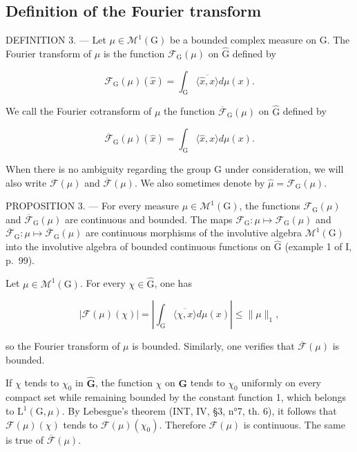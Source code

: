 \subsection{Definition of the Fourier transform}

DEFINITION 3. --- Let \(\mu \in \mathcal{M}^{1}(\mathrm{G})\) be a bounded complex measure on G. The Fourier transform of \(\mu\) is the function \(\mathcal{F}_{\mathrm{G}}(\mu)\) on \(\widehat{\mathrm{G}}\) defined by

\[
\mathcal {F} _ {\mathrm{G}} (\mu) (\widehat {x}) = \int_ {\mathrm{G}} \overline {{\langle \widehat {x} , x \rangle}} d \mu (x).\tag{5}
\]

We call the Fourier cotransform of \(\mu\) the function \(\overline{\mathcal{F}}_{\mathrm{G}}(\mu)\) on \(\widehat{\mathrm{G}}\) defined by

\[
\overline {{\mathcal {F}}} _ {\mathrm{G}} (\mu) (\widehat {x}) = \int_ {\mathrm{G}} \langle \widehat {x}, x \rangle d \mu (x).\tag{6}
\]

When there is no ambiguity regarding the group G under consideration, we will also write \(\mathcal{F}(\mu)\) and \(\overline{\mathcal{F}}(\mu)\). We also sometimes denote by \(\widehat{\mu} = \mathcal{F}_{\mathrm{G}}(\mu)\).

PROPOSITION 3. --- For every measure \(\mu \in \mathcal{M}^{1}(\mathrm{G})\), the functions \(\mathcal{F}_{\mathrm{G}}(\mu)\) and \(\overline{\mathcal{F}}_{\mathrm{G}}(\mu)\) are continuous and bounded. The maps \(\mathcal{F}_{\mathrm{G}}: \mu \mapsto \mathcal{F}_{\mathrm{G}}(\mu)\) and \(\overline{\mathcal{F}}_{\mathrm{G}}: \mu \mapsto \overline{\mathcal{F}}_{\mathrm{G}}(\mu)\) are continuous morphisms of the involutive algebra \(\mathcal{M}^{1}(\mathrm{G})\) into the involutive algebra of bounded continuous functions on \(\widehat{\mathrm{G}}\) (example 1 of I, p.~99).

Let \(\mu \in \mathcal{M}^1 (\mathrm{G})\). For every \(\chi \in \widehat{\mathrm{G}}\), one has

\[
| \mathcal {F} (\mu) (\chi) | = \left| \int_ {\mathrm{G}} \overline {{\langle \chi , x \rangle}} d \mu (x) \right| \leqslant \| \mu \| _ {1},\tag{7}
\]

so the Fourier transform of \(\mu\) is bounded. Similarly, one verifies that \(\overline{\mathcal{F}}(\mu)\) is bounded.

If \(\chi\) tends to \(\chi_0\) in \(\widehat{\mathbf{G}}\), the function \(\chi\) on \(\mathbf{G}\) tends to \(\chi_0\) uniformly on every compact set while remaining bounded by the constant function 1, which belongs to \(\mathrm{L}^1 (\mathrm{G},\mu)\). By Lebesgue's theorem (INT, IV, §3, n°7, th. 6), it follows that \(\mathcal{F}(\mu)(\chi)\) tends to \(\mathcal{F}(\mu)(\chi_0)\). Therefore \(\mathcal{F}(\mu)\) is continuous. The same is true of \(\overline{\mathcal{F}} (\mu)\).

